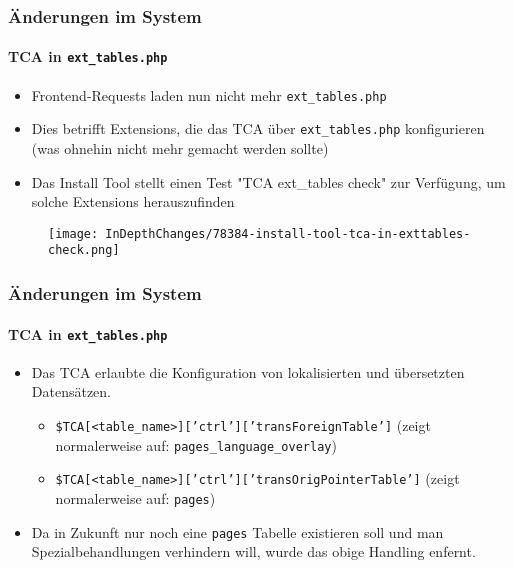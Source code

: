 \begin{frame}[fragile]
	\frametitle{Änderungen im System}
	\framesubtitle{TCA in \texttt{ext\_tables.php}}

	\begin{itemize}
		\item Frontend-Requests laden nun nicht mehr \texttt{ext\_tables.php}
		\item Dies betrifft Extensions, die das TCA über \texttt{ext\_tables.php} konfigurieren\newline
			\small(was ohnehin nicht mehr gemacht werden sollte)\normalsize
		\item Das Install Tool stellt einen Test "TCA ext\_tables check" zur Verfügung, um solche Extensions herauszufinden
	\end{itemize}

	\begin{figure}
		\texttt{[image: InDepthChanges/78384-install-tool-tca-in-exttables-check.png]}
	\end{figure}

\end{frame}
\begin{frame}[fragile]
	\frametitle{Änderungen im System}
	\framesubtitle{TCA in \texttt{ext\_tables.php}}

	\begin{itemize}
		\item Das TCA erlaubte die Konfiguration von lokalisierten und übersetzten Datensätzen.

			\begin{itemize}
				\item \texttt{\$TCA[<table\_name>]['ctrl']['transForeignTable']}\newline
					(zeigt normalerweise auf: \texttt{pages\_language\_overlay})
				\item \texttt{\$TCA[<table\_name>]['ctrl']['transOrigPointerTable']}\newline
					(zeigt normalerweise auf: \texttt{pages})
			\end{itemize}

		\item Da in Zukunft nur noch eine \texttt{pages} Tabelle existieren soll und man Spezialbehandlungen
			verhindern will, wurde das obige Handling enfernt.

	\end{itemize}

\end{frame}

